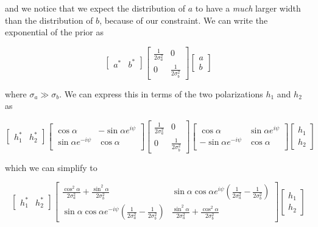\documentclass[10pt]{article}
\begin{document}
and we notice that we expect the distribution of $a$ to have a \emph{much} larger width than the distribution of $b$, because of our constraint. We can write the exponential of the prior as

\begin{equation}
\begin{bmatrix} a^\ast & b^\ast \end{bmatrix} \begin{bmatrix} \frac{1}{2\sigma_a^2} & 0 \\ 0 & \frac{1}{2\sigma_b^2} \end{bmatrix} \begin{bmatrix} a \\ b \end{bmatrix}
\end{equation}

where $\sigma_a\gg\sigma_b$. We can express this in terms of the two polarizations $h_1$ and $h_2$ as

\begin{equation}
\begin{bmatrix} h_1^\ast & h_2^\ast \end{bmatrix}
\begin{bmatrix}
\cos\alpha & -\sin\alpha e^{i\psi} \\
\sin\alpha e^{-i\psi} & \cos\alpha \\
\end{bmatrix}
 \begin{bmatrix}
 \frac{1}{2\sigma_a^2} & 0 \\ 
0 & \frac{1}{2\sigma_b^2} 
\end{bmatrix}
\begin{bmatrix}
\cos\alpha & \sin\alpha e^{i\psi} \\
-\sin\alpha e^{-i\psi} & \cos\alpha \\
\end{bmatrix}
\begin{bmatrix} h_1 \\ h_2 \end{bmatrix}
\end{equation}

which we can simplify to

\begin{equation}
\begin{bmatrix} h_1^\ast & h_2^\ast \end{bmatrix}
\begin{bmatrix}
\frac{\cos^2\alpha}{2\sigma_a^2} + \frac{\sin^2\alpha}{2\sigma_b^2}                     & \sin\alpha\cos\alpha e^{i\psi}\left(\frac{1}{2\sigma_a^2}-\frac{1}{2\sigma_b^2}\right) \\
\sin\alpha\cos\alpha e^{-i\psi}\left(\frac{1}{2\sigma_a^2}-\frac{1}{2\sigma_b^2}\right) & \frac{\sin^2\alpha}{2\sigma_a^2} + \frac{\cos^2\alpha}{2\sigma_b^2}
\end{bmatrix}
\begin{bmatrix} h_1 \\ h_2 \end{bmatrix}
\end{equation}
\end{document}
